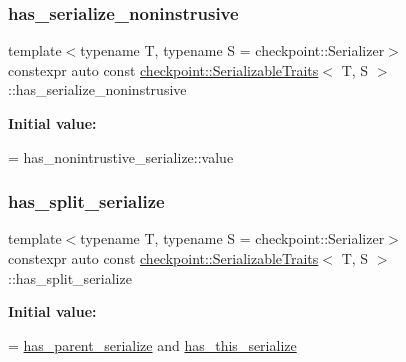 \subsubsection{\texorpdfstring{has\+\_\+serialize\+\_\+noninstrusive}{has\_serialize\_noninstrusive}}
{\footnotesize\ttfamily template$<$typename T, typename S = checkpoint\+::\+Serializer$>$ \\
constexpr auto const \hyperlink{structcheckpoint_1_1_serializable_traits}{checkpoint\+::\+Serializable\+Traits}$<$ T, S $>$\+::has\+\_\+serialize\+\_\+noninstrusive\hspace{0.3cm}{\ttfamily [static]}}

{\bfseries Initial value\+:}
\begin{DoxyCode}
=
    has\_nonintrustive\_serialize::value
\end{DoxyCode}
\mbox{\label{structcheckpoint_1_1_serializable_traits_a1fa333e360a0dfeafebe350436ae9141}} 
\subsubsection{\texorpdfstring{has\+\_\+split\+\_\+serialize}{has\_split\_serialize}}
{\footnotesize\ttfamily template$<$typename T, typename S = checkpoint\+::\+Serializer$>$ \\
constexpr auto const \hyperlink{structcheckpoint_1_1_serializable_traits}{checkpoint\+::\+Serializable\+Traits}$<$ T, S $>$\+::has\+\_\+split\+\_\+serialize\hspace{0.3cm}{\ttfamily [static]}}

{\bfseries Initial value\+:}
\begin{DoxyCode}
=
    \hyperlink{structcheckpoint_1_1_serializable_traits_a122e712dd9adffac78f239a7c30b0a8f}{has\_parent\_serialize} and \hyperlink{structcheckpoint_1_1_serializable_traits_ab228ede8ce64a9aaebf9ce43ac388400}{has\_this\_serialize}
\end{DoxyCode}
\mbox{\label{structcheckpoint_1_1_serializable_traits_ab228ede8ce64a9aaebf9ce43ac388400}} 
